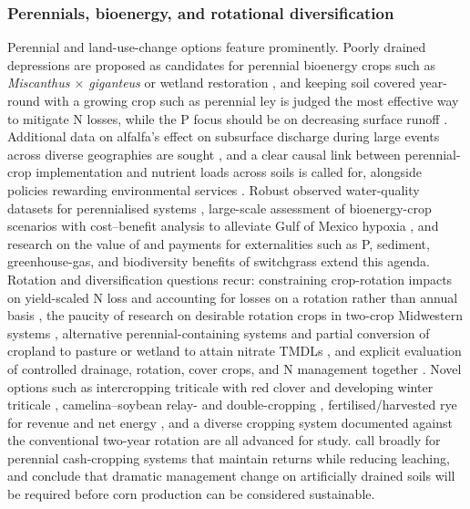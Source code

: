 \documentclass[11pt]{article}
\begin{document}
\subsubsection{Perennials, bioenergy, and rotational diversification}

Perennial and land-use-change options feature prominently. Poorly drained depressions are proposed as candidates for perennial bioenergy crops such as \textit{Miscanthus $\times$ giganteus} or wetland restoration \parencite{Huang2023}, and keeping soil covered year-round with a growing crop such as perennial ley is judged the most effective way to mitigate N losses, while the P focus should be on decreasing surface runoff \parencite{Norberg2022}. Additional data on alfalfa's effect on subsurface discharge during large events across diverse geographies are sought \parencite{Arrueta2025}, and a clear causal link between perennial-crop implementation and nutrient loads across soils is called for, alongside policies rewarding environmental services \parencite{Arrueta2022}. Robust observed water-quality datasets for perennialised systems \parencite{Wilson2023}, large-scale assessment of bioenergy-crop scenarios with cost--benefit analysis to alleviate Gulf of Mexico hypoxia \parencite{Guo2018}, and research on the value of and payments for externalities such as P, sediment, greenhouse-gas, and biodiversity benefits of switchgrass \parencite{Woodbury2018} extend this agenda. Rotation and diversification questions recur: constraining crop-rotation impacts on yield-scaled N loss and accounting for losses on a rotation rather than annual basis \parencite{Zhao2016}, the paucity of research on desirable rotation crops in two-crop Midwestern systems \parencite{Pasley2021}, alternative perennial-containing systems and partial conversion of cropland to pasture or wetland to attain nitrate TMDLs \parencite{Randall2001,Gowda2007,Nangia2008}, and explicit evaluation of controlled drainage, rotation, cover crops, and N management together \parencite{Ma2007b}. Novel options such as intercropping triticale with red clover and developing winter triticale \parencite{Nance2007}, camelina--soybean relay- and double-cropping \parencite{Emmett2022}, fertilised/harvested rye for revenue and net energy \parencite{Malone2018,Malone2023}, and a diverse cropping system documented against the conventional two-year rotation \parencite{Gentry2025} are all advanced for study. \textcite{Dinnes2002} call broadly for perennial cash-cropping systems that maintain returns while reducing leaching, and \textcite{Jaynes2001} conclude that dramatic management change on artificially drained soils will be required before corn production can be considered sustainable.
\end{document}
